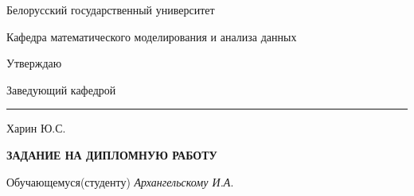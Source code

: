 \documentclass[a4papper,11pt]{report}
\begin{document}
    \begin{center}
        Белорусский государственный университет

        \vspace{2em}

        Кафедра математического моделирования и анализа данных

        \vspace{2em}

        \begin{minipage}[h]{0.7\textwidth}
        Утверждаю

        Заведующий кафедрой \rule{3cm}{0.4pt} Харин Ю.С.
        \end{minipage}

        \vspace{2em}

        \textbf{\Large{ЗАДАНИЕ НА ДИПЛОМНУЮ РАБОТУ}}
    \end{center}

    \vspace{2em}

    Обучающемуся(студенту) \textit{Архангельскому И.А}.
\end{document}
